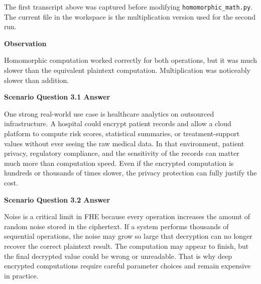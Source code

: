 \documentclass[12pt]{article}
\begin{document}
The first transcript above was captured before modifying \texttt{homomorphic\_math.py}. The current file in the workspace is the multiplication version used for the second run.

\textbf{Observation}

Homomorphic computation worked correctly for both operations, but it was much slower than the equivalent plaintext computation. Multiplication was noticeably slower than addition.

\textbf{Scenario Question 3.1 Answer}

One strong real-world use case is healthcare analytics on outsourced infrastructure. A hospital could encrypt patient records and allow a cloud platform to compute risk scores, statistical summaries, or treatment-support values without ever seeing the raw medical data. In that environment, patient privacy, regulatory compliance, and the sensitivity of the records can matter much more than computation speed. Even if the encrypted computation is hundreds or thousands of times slower, the privacy protection can fully justify the cost.

\textbf{Scenario Question 3.2 Answer}

Noise is a critical limit in FHE because every operation increases the amount of random noise stored in the ciphertext. If a system performs thousands of sequential operations, the noise may grow so large that decryption can no longer recover the correct plaintext result. The computation may appear to finish, but the final decrypted value could be wrong or unreadable. That is why deep encrypted computations require careful parameter choices and remain expensive in practice.
\end{document}
